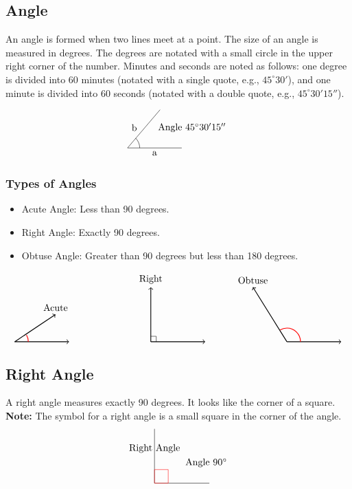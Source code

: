 \subsection{Angle}
An angle is formed when two lines meet at a point. The size of an angle is measured in degrees. The degrees are notated with a small circle in the upper right corner of the number. Minutes and seconds are noted as follows: one degree is divided into 60 minutes (notated with a single quote, e.g., \(45^\circ 30'\)), and one minute is divided into 60 seconds (notated with a double quote, e.g., \(45^\circ 30' 15''\)).

\[
\begin{tikzpicture}
    \draw (0,0) -- (2,0);
    \node[below] at (1,0) {a};
    \draw (0,0) -- (1.2,1.4);
    \node[above] at (0.25,0.5) {b};
    \node[right] at (1,0.75) {Angle \(45^\circ 30' 15''\)};
    \draw (0.45,0) arc[start angle=0, end angle=45.5042, radius=0.5];
\end{tikzpicture}
\]

\subsubsection{Types of Angles}
\begin{itemize}
    \item Acute Angle: Less than 90 degrees.
    \item Right Angle: Exactly 90 degrees.
    \item Obtuse Angle: Greater than 90 degrees but less than 180 degrees.
\end{itemize}

\[
\begin{tikzpicture}
    \draw[thick,->] (0,0) -- (2,0);
    \draw[thick,->] (0,0) -- (1.5,1) node[above] {Acute};
    \draw[red,thick] (0.5,0) arc[start angle=0, end angle=30, radius=0.5];

    \draw[thick,->] (5,0) -- (7,0);
    \draw[thick,->] (5,0) -- (5,2) node[above] {Right};
    \draw (5.2,0) -- (5.2,0.2) -- (5,0.2);

    \draw[thick,->] (10,0) -- (12,0);
    \draw[thick,->] (10,0) -- (8.75,2) node[above] {Obtuse};
    \draw[red,thick] (10.5,0) arc[start angle=0, end angle=120, radius=0.5];
\end{tikzpicture}
\]

\subsection{Right Angle}
A right angle measures exactly 90 degrees. It looks like the corner of a square.
\textbf{Note:} The symbol for a right angle is a small square in the corner of the angle.
\[
\begin{tikzpicture}
    \draw (0,0) -- (2,0);
    \draw (0,0) -- (0,2);
    \node[right] at (1,0.75) {Angle \(90^\circ\)};
    \node[above] at (0,1) {Right Angle};
    \draw[red] (0,0) rectangle (0.5,0.5);
\end{tikzpicture}
\]

